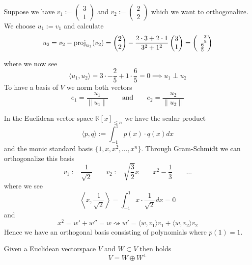 \begin{example}
   Suppose we have \(v_1 := \begin{pmatrix}3\\1\end{pmatrix}\) and \(v_2 := \begin{pmatrix}2\\2\end{pmatrix}\) which we want to orthogonalize.
   We choose \(u_1 := v_1\) and calculate
   \[u_2 = v_2 - \operatorname{proj}_{u_1}(v_2) = \begin{pmatrix}2\\2\end{pmatrix} - \frac{2 \cdot 3 + 2 \cdot 1}{3^2 + 1^2} \begin{pmatrix}3\\1\end{pmatrix} = \begin{pmatrix}-\frac{2}{5}\\\frac{6}{5}\end{pmatrix}\]

   \begin{center}
      
   \end{center}

   where we now see
   \[\langle u_1, u_2 \rangle = 3 \cdot -\frac{2}{5} + 1 \cdot \frac{6}{5} = 0 \implies u_1 \perp u_2\]
   To have a basis of \(V\) we norm both vectors
   \[e_1 = \frac{u_1}{\|u_1\|} \qquad\text{and}\qquad e_2 = \frac{u_2}{\|u_2\|}\]
\end{example}

\begin{example}
   In the Euclidean vector space \(\mathbb{R}[x]_{\leq n}\) we have the scalar product
   \[\langle p, q\rangle := \int_{-1}^1 p(x) \cdot q(x) dx\]
   and the monic standard basis \(\{1, x, x^2, \ldots, x^n\}\).
   Through Gram-Schmidt we can orthogonalize this basis
   \[v_1 := \frac{1}{\sqrt{2}} \qquad v_2 := \sqrt{\frac{3}{2}}x \qquad x^2 - \frac{1}{3} \qquad \ldots\]
   where we see
   \[\left\langle x, \frac{1}{\sqrt{2}}\right\rangle = \int_{-1}^1 x \cdot \frac{1}{\sqrt{2}} dx = 0\]
   and
   \[x^2 = w' + w'' = w \rightsquigarrow w' = \langle w, v_1 \rangle v_1 + \langle w, v_2\rangle v_2\]
   Hence we have an orthogonal basis consisting of polynomials where \(p(1) = 1\).
\end{example}

\begin{corollary}\label{cor:gram-schmidt}
   Given a Euclidean vectorspace \(V\) and \(W \subset V\) then holds
   \[V = W \oplus W^\perp\]
\end{corollary}

